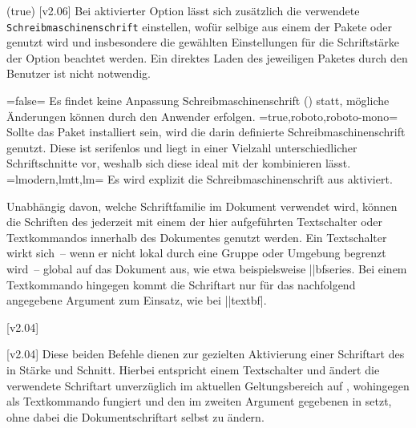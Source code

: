 \begin{DeclareEntity*}{}
\begin{DeclareEntity*}{}
\begin{DeclareEntity*}{}
\begin{Declaration}
  {}
  (true)
  [v2.06]
Bei aktivierter Option  lässt sich zusätzlich die verwendete
\texttt{Schreibmaschinenschrift} einstellen, wofür selbige aus einem der Pakete 
 oder  genutzt wird und insbesondere die 
gewählten Einstellungen für die Schriftstärke der Option  
beachtet werden. Ein direktes Laden des jeweiligen Paketes durch den Benutzer 
ist nicht notwendig.
%
\begin{DeclareValues}
\itemval=false=
  Es findet keine Anpassung Schreibmaschinenschrift () statt, 
  mögliche Änderungen können durch den Anwender erfolgen.
\itemval*=true,roboto,roboto-mono=
  Sollte das Paket  installiert sein, wird die darin 
  definierte Schreibmaschinenschrift genutzt. Diese ist serifenlos und liegt in 
  einer Vielzahl unterschiedlicher Schriftschnitte vor, weshalb sich diese 
  ideal mit der \OpenSans kombinieren lässt.
\itemval=lmodern,lmtt,lm=
  Es wird explizit die Schreibmaschinenschrift aus  aktiviert. 
\end{DeclareValues}
\end{Declaration}



Unabhängig davon, welche Schriftfamilie im Dokument verwendet wird, können die 
Schriften des \CDs jederzeit mit einem der hier aufgeführten Textschalter oder 
Textkommandos innerhalb des Dokumentes genutzt werden. Ein Textschalter wirkt 
sich~-- wenn er nicht lokal durch eine Gruppe oder Umgebung begrenzt wird~-- 
global auf das Dokument aus, wie etwa beispielsweise \Macro||{bfseries}. Bei 
einem Textkommando hingegen kommt die Schriftart nur für das nachfolgend 
angegebene Argument zum Einsatz, wie bei \Macro||{textbf|}. 
%
\begin{Declaration}
  {}
  [v2.04]
\begin{Declaration}
  {}
  [v2.04]
\printdeclarationlist
%
Diese beiden Befehle dienen zur gezielten Aktivierung einer Schriftart des \CDs 
in Stärke und Schnitt. Hierbei entspricht  einem Textschalter und 
ändert die verwendete Schriftart unverzüglich im aktuellen Geltungsbereich auf 
, wohingegen  als Textkommando fungiert und den 
im zweiten Argument gegebenen  in  setzt, ohne 
dabei die Dokumentschriftart selbst zu ändern.


\end{Declaration}
\end{Declaration}
\end{DeclareEntity*}
\end{DeclareEntity*}
\end{DeclareEntity*}
